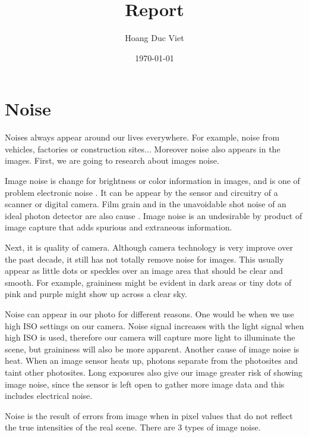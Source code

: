 \documentclass[10pt]{article}
\begin{document}
		\title{Report}
		\author{Hoang Duc Viet}
		\date{\today}
		\maketitle

\newpage
\newpage
\section{Noise}
Noises always appear around our lives everywhere. For example, noise from vehicles, factories or construction sites... Moreover noise also appears in the images. First, we are going to research about images noise.

Image noise is change for brightness or color information in images, and is one of problem electronic noise . It can be appear by the sensor and circuitry of a scanner or digital camera.  Film grain and in the unavoidable shot noise of an ideal photon detector are also cause  . Image noise is an undesirable by product of image capture that adds spurious and extraneous information.

Next, it is quality of camera. Although camera technology is very improve over the past decade, it still has not totally remove noise for images. This usually appear as little dots or speckles over an image area that should be clear and smooth. For example, graininess might be evident in dark areas or tiny dots of pink and purple might show up across a clear sky.

Noise can appear in our photo for different reasons. One would be when we use high ISO settings on our camera. Noise signal increases with the light signal when high ISO is used, therefore our camera will capture more light to illuminate the scene, but graininess will also be more apparent. Another cause of image noise is heat. When an image sensor heats up, photons separate from the photosites and taint other photosites. Long exposures also give our image greater risk of showing image noise, since the sensor is left open to gather more image data and this includes electrical noise.

Noise is the result of errors from image when in pixel values that do not reflect the true intensities of the real scene. There are 3 types of image noise.
\end{document}
